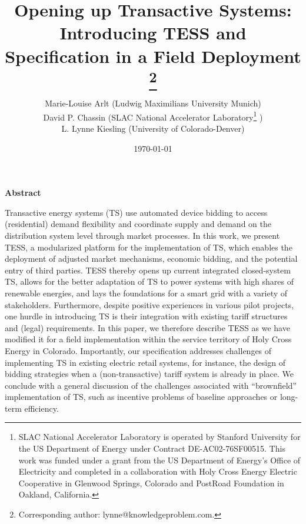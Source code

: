 \documentclass[12pt]{article}%
\begin{document}
\setcounter{page}{0}

\singlespacing

\title{
Opening up Transactive Systems: Introducing TESS and Specification in a Field Deployment
\thanks{Corresponding author: lynne@knowledgeproblem.com. 
} 
\\ }

\date{\today}
\author{Marie-Louise Arlt (Ludwig Maximilians University Munich) \\ David P. Chassin (SLAC National Accelerator Laboratory\footnote{SLAC National Accelerator Laboratory is operated by Stanford University for the US Department of Energy under Contract DE-AC02-76SF00515. This work was funded under a grant from the US Department of Energy's Office of Electricity and completed in a collaboration with Holy Cross Energy Electric Cooperative in Glenwood Springs, Colorado and PostRoad Foundation in Oakland, California.} ) \\ L. Lynne Kiesling (University of Colorado-Denver) \\}  
\maketitle

\thispagestyle{empty}

\sloppy%


\thispagestyle{empty}


\singlespacing
\begin{center}
\large \textbf{Abstract}
\end{center}

\noindent 
Transactive energy systems (TS) use automated device bidding to access (residential) demand flexibility and coordinate supply and demand on the distribution system level through market processes. 
In this work, we present TESS, a modularized platform for the implementation of TS, which enables the deployment of adjusted market mechanisms, economic bidding, and the potential entry of third parties. TESS thereby opens up current integrated closed-system TS, allows for the better adaptation of TS to power systems with high shares of renewable energies, and lays the foundations for a smart grid with a variety of stakeholders.
Furthermore, despite positive experiences in various pilot projects, one hurdle in introducing TS is their integration with existing tariff structures and (legal) requirements. In this paper, we therefore describe TESS as we have modified it for a field implementation within the service territory of Holy Cross Energy in Colorado. Importantly, our specification addresses challenges of implementing TS in existing electric retail systems, for instance, the design of bidding strategies when a (non-transactive) tariff system is already in place.
We conclude with a general discussion of the challenges associated with ``brownfield'' implementation of TS, such as incentive problems of baseline approaches or long-term efficiency.
\end{document}
